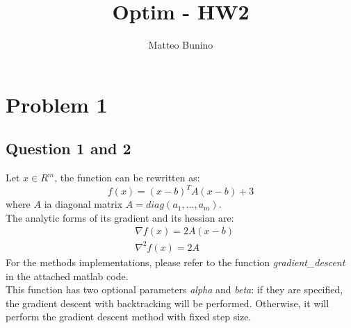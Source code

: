 \documentclass[]{article}
\title{Optim - HW2}
\author{Matteo Bunino}
\begin{document}
\maketitle


\section*{Problem 1}
\subsection*{Question 1 and 2}
Let $x\in R^m$, the function can be rewritten as:
\begin{equation}
	f(x) = (x-b)^TA(x-b)+3
\end{equation}
where $A$ ia diagonal matrix $A = diag(a_1, \dots, a_m)$.\\
The analytic forms of its gradient and its hessian are:
\begin{equation}
	\begin{aligned}
		& \nabla f(x) = 2A(x-b)\\
		& \nabla^2f(x)=2A
	\end{aligned}
\end{equation}
For the methods implementations, please refer to the function \textit{gradient\_descent} in the attached matlab code.\\
This function has two optional parameters \textit{alpha} and \textit{beta}: if they are specified, the gradient descent with backtracking will be performed. Otherwise, it will perform the gradient descent method with fixed step size.
\end{document}
